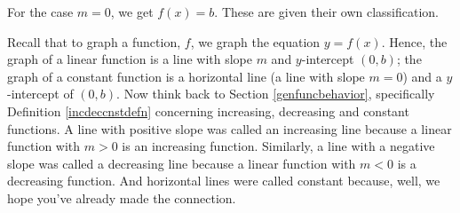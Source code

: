 \medskip


\medskip

For the case $m=0$, we get $f(x) = b$.  These are given their own classification.

\medskip


\medskip

Recall that to graph a function, $f$, we graph the equation $y=f(x)$. Hence, the graph of a linear function is a line with slope $m$ and $y$-intercept $(0,b)$; the graph of a constant function is a horizontal line (a line with slope $m = 0$) and a $y$-intercept of $(0,b)$.  Now think back to Section \ref{genfuncbehavior}, specifically Definition \ref{incdeccnstdefn} concerning increasing, decreasing and constant functions.  A line with positive slope was called an increasing line because a linear function with $m > 0$ is an increasing function.  Similarly, a line with a negative slope was called a decreasing line because a linear function with $m < 0$ is a decreasing function.  And horizontal lines were called constant because, well, we hope you've already made the connection.  

\medskip

